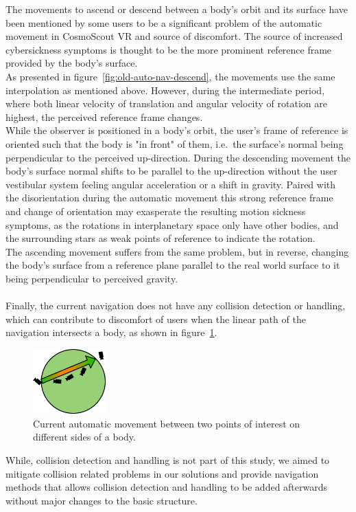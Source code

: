 The movements to ascend or descend between a body's orbit and its surface have been mentioned by some users to be a
significant problem of the automatic movement in CosmoScout VR and source of discomfort.
The source of increased cybersickness symptoms is thought to be the more prominent reference frame provided by the
body's surface.
\\
As presented in figure~\ref{fig:old-auto-nav-descend}, the movements use the same interpolation as mentioned above.
However, during the intermediate period, where both linear velocity of translation and angular velocity of rotation
are highest, the perceived reference frame changes.
\\
While the observer is positioned in a body's orbit, the user's frame of reference is oriented such that the body is
"in front" of them, i.e.\ the surface's normal being perpendicular to the perceived up-direction.
During the descending movement the body's surface normal shifts to be parallel to the up-direction without the user
vestibular system feeling angular acceleration or a shift in gravity.
Paired with the disorientation during the automatic movement this strong reference frame and change of orientation may
exasperate the resulting motion sickness symptoms, as the rotations in interplanetary space only have other bodies,
and the surrounding stars as weak points of reference to indicate the rotation.
\\
The ascending movement suffers from the same problem, but in reverse, changing the body's surface from a reference
plane parallel to the real world surface to it being perpendicular to perceived gravity.
\\
\\
Finally, the current navigation does not have any collision detection or handling, which can contribute to discomfort
of users when the linear path of the navigation intersects a body, as shown in figure~\ref{fig:old-auto-nav-collision}.

\begin{figure}[h]
    \centering
    \includegraphics[width=0.25\textwidth]{content/3_current_state/img/OldAutomaticNavigation_SurfaceCollision}
    \caption{Current automatic movement between two points of interest on different sides of a body.}
    \label{fig:old-auto-nav-collision}
\end{figure}

While, collision detection and handling is not part of this study, we aimed to mitigate collision related problems in
our solutions and provide navigation methods that allows collision detection and handling to be added afterwards
without major changes to the basic structure.
